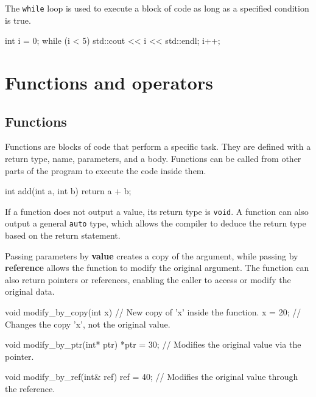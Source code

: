 The \texttt{while} loop is used to execute a block of code as long as a specified condition is true.

\begin{codeblock}[language=C++]
int i = 0;
while (i < 5) {
    std::cout << i << std::endl;
    i++;
}
\end{codeblock}

\section{Functions and operators}

\subsection{Functions}

Functions are blocks of code that perform a specific task. They are defined with a return type, name, parameters, and a body. Functions can be called from other parts of the program to execute the code inside them.

\begin{codeblock}[language=C++, numbers = none]
int add(int a, int b) {
    return a + b;
}
\end{codeblock}

If a function does not output a value, its return type is \texttt{void}. A function can also output a general \texttt{auto} type, which allows the compiler to deduce the return type based on the return statement.

Passing parameters by \textbf{value} creates a copy of the argument, while passing by \textbf{reference} allows the function to modify the original argument.
The function can also return pointers or references, enabling the caller to access or modify the original data.

\begin{codeblock}[language=C++, numbers = none]
void modify_by_copy(int x) { // New copy of 'x' inside the function.
    x = 20; // Changes the copy 'x', not the original value.
}

void modify_by_ptr(int* ptr) {
    *ptr = 30; // Modifies the original value via the pointer.
}

void modify_by_ref(int& ref) {
    ref = 40; // Modifies the original value through the reference.
}
\end{codeblock}

